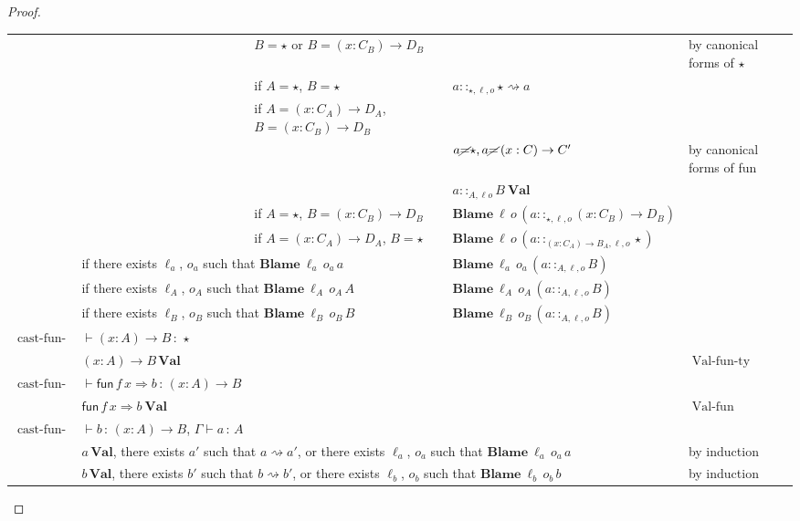 \begin{proof}
\begin{tabular}{lllll}
 &  & $B=\star$ or $B=\left(x:C_{B}\right)\rightarrow D_{B}$ &  & by canonical forms of $\star$\tabularnewline
 &  & if $A=\star$, $B=\star$  & $a::_{\star,\ensuremath{\ell},o}\star\rightsquigarrow a$ & \tabularnewline
 &  & if $A=\left(x:C_{A}\right)\rightarrow D_{A}$, $B=\left(x:C_{B}\right)\rightarrow D_{B}$ &  & \tabularnewline
 &  &  & $a\cancel{=}\star,a\cancel{=}\left(x:C\right)\rightarrow C'$ & by canonical forms of fun \tabularnewline
 &  &  & $a::_{A,\ensuremath{\ell}o}B\:\textbf{Val}$ & \tabularnewline
 &  & if $A=\star$, $B=\left(x:C_{B}\right)\rightarrow D_{B}$  & $\textbf{Blame}\:\ensuremath{\ell}\,o\,\left(a::_{\star,\ensuremath{\ell},o}\left(x:C_{B}\right)\rightarrow D_{B}\right)$ & \tabularnewline
 &  & if $A=\left(x:C_{A}\right)\rightarrow D_{A}$, $B=\star$ & $\textbf{Blame}\:\ensuremath{\ell}\,o\,\left(a::_{\left(x:C_{A}\right)\rightarrow B_{A},\ensuremath{\ell},o}\star\right)$ & \tabularnewline
 & \multicolumn{2}{l}{if there exists $\ell_{a}$, $o_{a}$ such that $\textbf{Blame}\:\ensuremath{\ell}_{a}\,o_{a}\,a$} & $\textbf{Blame}\:\ensuremath{\ell}_{a}\,o_{a}\,\left(a::_{A,\ensuremath{\ell},o}B\right)$ & \tabularnewline
 & \multicolumn{2}{l}{if there exists $\ell_{A}$, $o_{A}$ such that $\textbf{Blame}\:\ensuremath{\ell}_{A}\,o_{A}\,A$} & $\textbf{Blame}\:\ensuremath{\ell}_{A}\,o_{A}\,\left(a::_{A,\ensuremath{\ell},o}B\right)$ & \tabularnewline
 & \multicolumn{2}{l}{if there exists $\ell_{B}$, $o_{B}$ such that $\textbf{Blame}\:\ensuremath{\ell}_{B}\,o_{B}\,B$} & $\textbf{Blame}\:\ensuremath{\ell}_{B}\,o_{B}\,\left(a::_{A,\ensuremath{\ell},o}B\right)$ & \tabularnewline
$\operatorname{cast-fun-ty}$ & $\vdash\left(x:A\right)\rightarrow B\,:\,\star$ &  &  & \tabularnewline
 & $\left(x:A\right)\rightarrow B\,\textbf{Val}$ &  &  & $\operatorname{Val-fun-ty}$\tabularnewline
$\operatorname{cast-fun-app}$ & $\vdash\mathsf{fun}\,f\,x\Rightarrow b\,:\,\left(x:A\right)\rightarrow B$ &  &  & \tabularnewline
 & $\mathsf{fun}\,f\,x\Rightarrow b\:\textbf{Val}$ &  &  & $\operatorname{Val-fun}$\tabularnewline
$\operatorname{cast-fun-app}$ & \multicolumn{2}{l}{$\vdash b\,:\,\left(x:A\right)\rightarrow B$, $\Gamma\vdash a\,:\,A$} & \tabularnewline
 & \multicolumn{3}{l}{$a\,\textbf{Val}$, there exists $a'$ such that $a\rightsquigarrow a'$,
or there exists $\ell_{a}$, $o_{a}$ such that $\textbf{Blame}\:\ensuremath{\ell}_{a}\,o_{a}\,a$} & by induction\tabularnewline
 & \multicolumn{3}{l}{$b\,\textbf{Val}$, there exists $b'$ such that $b\rightsquigarrow b'$,
or there exists $\ell_{b}$, $o_{b}$ such that $\textbf{Blame}\:\ensuremath{\ell}_{b}\,o_{b}\,b$} & by induction\tabularnewline

\end{tabular}
\end{proof}
